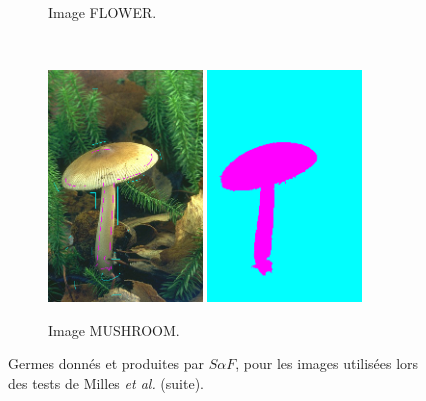 \begin{figure}[htb]
\begin{subfigure}[B]{0.7\textwidth}
		 \caption{Image FLOWER.}
	\end{subfigure}	
	\\
	 \begin{subfigure}[B]{0.7\textwidth}	
			\includegraphics[width=0.45\textwidth]{images/evaluation/Milles/208001_seeds.jpg}
			\includegraphics[width=0.45\textwidth]{images/evaluation/Milles/208001_seg.png}
		 \caption{Image MUSHROOM.}
	\end{subfigure}	
	\caption{Germes donnés et  produites par $S \alpha F$, pour les images utilisées lors des tests de Milles \textit{et al.} (suite).}
	\label{fig:eval:BinC2}
\end{figure}


